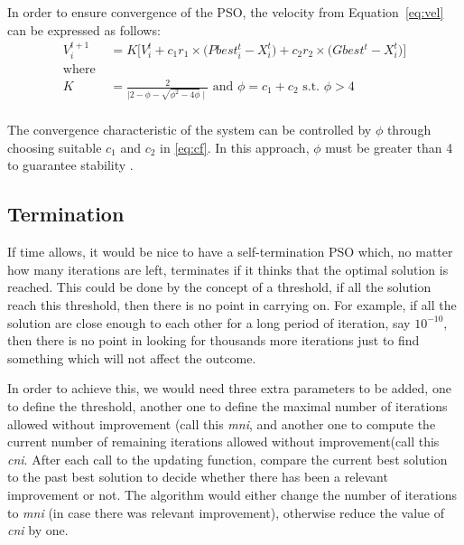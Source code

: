 \documentclass{pdfmx4020}
\begin{document}
    In order to ensure convergence of the PSO, the velocity from Equation~\ref{eq:vel} can be expressed as follows:
    \begin{equation} \label{eq:cf}
      \begin{split}
        V_{i}^{t+1} & = K \Bigg[ V_{i}^{t} + c_1 r_1 \times \Big( Pbest_{i}^{t} - X_{i}^{t} \Big) + c_2 r_2 \times \Big( Gbest^{t} - X_{i}^{t} \Big) \Bigg] \\
        \text{where }\\
        K & = \frac{2}{\mid 2 - \phi - \sqrt{\phi^2 -4\phi} \mid} \text{ and } \phi = c_1 + c_2 \text{ s.t. } \phi > 4  \\
      \end{split}
    \end{equation}

    The convergence characteristic of the system can be controlled by $\phi$ through choosing suitable $c_1$ and $c_2$ in \eqref{eq:cf}. In this approach, $\phi$ must be greater than 4 to guarantee stability \cite{constriction_factor_2}.
    \subsection{Termination} %
    \label{sub:termination}
    If time allows, it would be nice to have a self-termination PSO which, no matter how many iterations are left, terminates if it thinks that the optimal solution is reached. This could be done by the concept of a threshold, if all the solution reach this threshold, then there is no point in carrying on. For example, if all the solution are close enough to each other for a long period of iteration, say $10^{-10}$, then there is no point in looking for thousands more iterations just to find something which will not affect the outcome. 

    In order to achieve this, we would need three extra parameters to be added, one to define the threshold, another one to define the maximal number of iterations allowed without improvement (call this \textit{mni}, and another one to compute the current number of remaining iterations allowed without improvement(call this \textit{cni}. After each call to the updating function, compare the current best solution to the past best solution to decide whether there has been a relevant improvement or not. The algorithm would either change the number of iterations to \textit{mni} (in case there was relevant improvement), otherwise reduce the value of \textit{cni} by one. 
\end{document}
